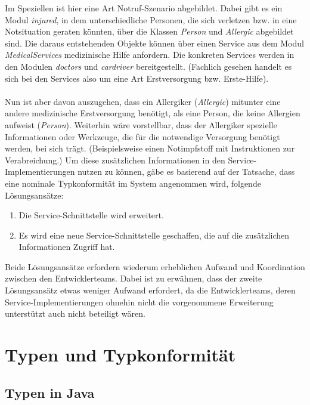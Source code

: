 \documentclass[11pt, 
ngerman,
doublespacing,
chapterinoneline, %
consistentlayout, %
]{scrartcl}
\begin{document}
Im Speziellen ist hier eine Art Notruf-Szenario abgebildet. Dabei gibt es ein Modul \emph{injured}, in dem unterschiedliche Personen, die sich verletzen bzw. in eine Notsituation geraten könnten, über die Klassen \emph{Person} und \emph{Allergic} abgebildet sind. Die daraus entstehenden Objekte können über einen Service aus dem Modul \emph{MedicalServices} medi\-zi\-nische Hilfe anfordern. Die konkreten Services werden in den Modulen \emph{doctors} und \emph{cardriver} bereitgestellt. (Fachlich gesehen handelt es sich bei den Services also um eine Art Erstversorgung bzw. Erste-Hilfe).\\\\
Nun ist aber davon auszugehen, dass ein Allergiker (\emph{Allergic}) mitunter eine andere medizinische Erstversorgung benötigt, als eine Person, die keine Allergien aufweist \linebreak(\emph{Person}). Weiterhin wäre vorstellbar, dass der Allergiker spezielle Informationen oder Werkzeuge, die für die notwendige Versorgung benötigt werden, bei sich trägt. (Beispiels\-weise einen Notimpfstoff mit Instruktionen zur Verabreichung.) Um diese zusätzlichen Informationen in den Service-Implementierungen nutzen zu können, gäbe es basierend auf der Tatsache, dass eine nominale Typkonformität im System angenommen wird, folgende Lösungsansätze:
\begin{enumerate}
\item Die Service-Schnittstelle wird erweitert.
\item Es wird eine neue Service-Schnittstelle geschaffen, die auf die zusätzlichen Infor\-mationen Zugriff hat.
\end{enumerate}
Beide Lösungsansätze erfordern wiederum erheblichen Aufwand und Koordination zwischen den Entwicklerteams. Dabei ist zu erwähnen, dass der zweite Lösungsansätz etwas weniger Aufwand erfordert, da die Entwicklerteams, deren Service-Implementierungen ohnehin nicht die vorgenommene Erweiterung unterstützt auch nicht beteiligt wären. 

\section{Typen und Typkonformität}
\cite{types}
\subsection{Typen in Java}
\end{document}
